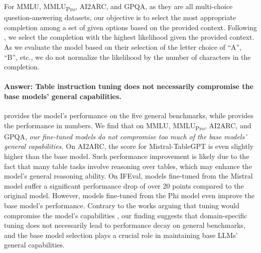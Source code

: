 \documentclass[11pt]{article}
\begin{document}
For MMLU, MMLU\textsubscript{Pro}, AI2ARC, and GPQA, as they are all multi-choice question-answering datasets, our objective is to select the most appropriate completion among a set of given options based on the provided context. 
Following \citet{touvron2023llama}, we select the completion with the highest likelihood given the provided context. 
As we evaluate the model based on their selection of the letter choice of ``A'', ``B'', etc., we do not normalize the likelihood by the number of characters in the completion.

\paragraph{Answer: Table instruction tuning does not necessarily compromise the base models' general capabilities.}
 provides the model's performance on the five general benchmarks, while  provides the performance in numbers.
We find that on MMLU, MMLU\textsubscript{Pro}, AI2ARC, and GPQA, \textit{our fine-tuned models do not compromise too much of the base models' general capabilities.}
On AI2ARC, the score for Mistral-TableGPT is even slightly higher than the base model.
Such performance improvement is likely due to the fact that many table tasks involve reasoning over tables, which may enhance the model's general reasoning ability.
On IFEval, models fine-tuned from the Mistral model suffer a significant performance drop of over 20 points compared to the original model.
However, models fine-tuned from the Phi model even improve the base model's performance.
Contrary to the works arguing that tuning would compromise the model's capabilities \citep{luo2023empirical}, our finding suggests that domain-specific tuning does not necessarily lead to performance decay on general benchmarks, and the base model selection plays a crucial role in maintaining base LLMs' general capabilities.

\end{document}
